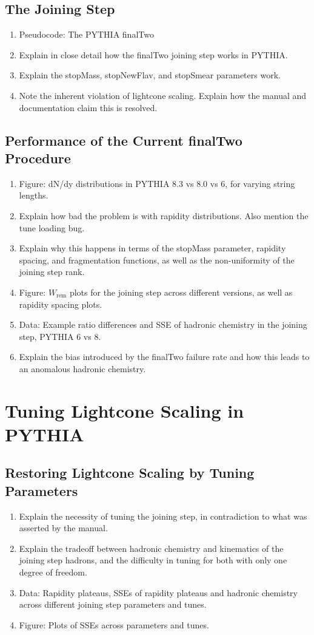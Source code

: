 \documentclass[12pt,a4paper]{report}
\begin{document}
\section{The Joining Step}
\begin{enumerate}
\item Pseudocode: The PYTHIA finalTwo
\item Explain in close detail how the finalTwo joining step works in PYTHIA.
\item Explain the stopMass, stopNewFlav, and stopSmear parameters work.
\item Note the inherent violation of lightcone scaling. Explain how the manual and documentation claim this is resolved.
\end{enumerate}

\section{Performance of the Current finalTwo Procedure}
\begin{enumerate}
\item Figure: dN/dy distributions in PYTHIA 8.3 vs 8.0 vs 6, for varying string lengths.
\item Explain how bad the problem is with rapidity distributions. Also mention the tune loading bug.
\item Explain why this happens in terms of the stopMass parameter, rapidity spacing, and fragmentation functions, as well as the non-uniformity of the joining step rank.
\item Figure: $W_\text{rem}$ plots for the joining step across different versions, as well as rapidity spacing plots.
\item Data: Example ratio differences and SSE of hadronic chemistry in the joining step, PYTHIA 6 vs 8.
\item Explain the bias introduced by the finalTwo failure rate and how this leads to an anomalous hadronic chemistry.
\end{enumerate}

\chapter{Tuning Lightcone Scaling in PYTHIA}
\label{chap:tuning}
\section{Restoring Lightcone Scaling by Tuning Parameters}
\begin{enumerate}
\item Explain the necessity of tuning the joining step, in contradiction to what was asserted by the manual.
\item Explain the tradeoff between hadronic chemistry and kinematics of the joining step hadrons, and the difficulty in tuning for both with only one degree of freedom.
\item Data: Rapidity plateaus, SSEs of rapidity plateaus and hadronic chemistry across different joining step parameters and tunes.
\item Figure: Plots of SSEs across parameters and tunes.
\end{enumerate}
\end{document}
